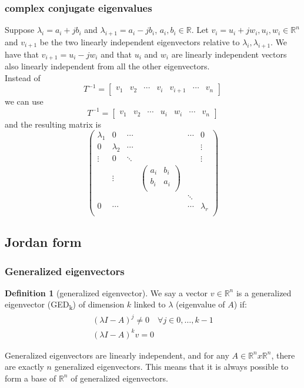 \documentclass{book}
\newcommand{\R}{\mathbb{R}}
\theoremstyle{definition}
\newtheorem{definition}{Definition}[section]
\theoremstyle{remark}
\theoremstyle{remark}
\begin{document}
\subsubsection{complex conjugate eigenvalues}
Suppose $\lambda_i = a_i+jb_i$ and $\lambda_{i+1}=a_i-jb_i$, $a_i,b_i \in \R$. Let $v_i=u_i+jw_i, u_i,w_i \in \R^n$ and $v_{i+1}$ be the two linearly independent eigenvectors relative to $\lambda_i, \lambda_{i+1}$. We have that $v_{i+1}=u_i-jw_i$ and that $u_i$ and $w_i$ are linearly independent vectors also linearly independent from all the other eigenvectors.\\
Instead of
\[
T^{-1} = \begin{bmatrix}
    v_1 & v_2 & \cdots & v_i & v_{i+1} & \cdots & v_n
\end{bmatrix}
\]
we can use
\[
T^{-1} = \begin{bmatrix}
    v_1 & v_2 & \cdots & u_i & w_i & \cdots & v_n
\end{bmatrix}
\]
and the resulting matrix is
\[
\begin{pmatrix}
    \lambda_1 & 0 & \cdots & & \cdots & 0 \\
    0 & \lambda_2 & \cdots & &  & \vdots \\
    \vdots & 0 & \ddots & & & \vdots \\
     & \vdots & & \begin{pmatrix}
         a_i & b_i \\
         b_i & a_i \\
     \end{pmatrix} & & \\
      & & & & \ddots & \\
     0 & \cdots & & & \cdots& \lambda_r\\
\end{pmatrix}
\]


\subsection{Jordan form}
\subsubsection{Generalized eigenvectors}
\begin{definition}[generalized eigenvector]
    We say a vector $v \in \R^n$ is a generalized eigenvector (GED\textsubscript{k}) of dimension $k$ linked to $\lambda$ (eigenvalue of $A$) if:
    \begin{gather*}
        (\lambda I -A)^j \neq 0 \quad \forall j \in 0,\dots,k-1 \\
        (\lambda I -A)^kv=0   
    \end{gather*}
\end{definition}
Generalized eigenvectors are linearly independent, and for any $A \in \R^nx\R^n$, there are exactly $n$ generalized eigenvectors. This means that it is always possible to form a base of $\R^n$ of generalized eigenvectors.
\end{document}
